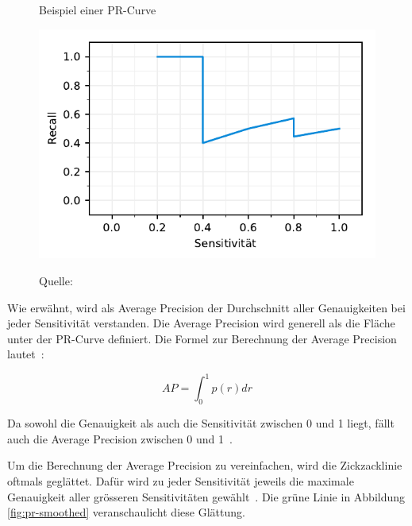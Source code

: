 \begin{figure}[h!]
    \captionsetup{width=.9\linewidth}
    \caption{Beispiel einer PR-Curve}
    \label{fig:ap-pr}
    \centering
    \includegraphics[scale=1]{graphics/matplot/ap__pr.pdf}\\
    \caption*{Quelle: \textcite{AP}}
\end{figure}

Wie erwähnt, wird als Average Precision der Durchschnitt aller Genauigkeiten bei jeder Sensitivität verstanden. Die Average Precision wird generell als die Fläche unter der PR-Curve definiert. Die Formel zur Berechnung der Average Precision lautet~\autocite{AP}:

\nopagebreak 
$$AP = \int_{0}^{1}p(r)dr$$
\vspace*{0.2cm}

Da sowohl die Genauigkeit als auch die Sensitivität zwischen 0 und 1 liegt, fällt auch die Average Precision zwischen 0 und 1~\autocite{AP}.

Um die Berechnung der Average Precision zu vereinfachen, wird die Zickzacklinie oftmals geglättet. Dafür wird zu jeder Sensitivität jeweils die maximale Genauigkeit aller grösseren Sensitivitäten gewählt~\autocite{AP}. Die grüne Linie in Abbildung \ref{fig:pr-smoothed} veranschaulicht diese Glättung.

